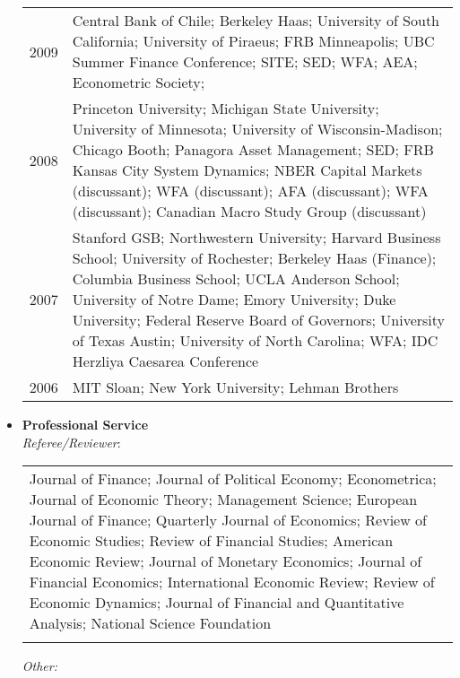 \documentclass[11pt,letterpaper,serif,overlapped]{res}
\begin{document}
\begin{resume}
\begin{itemize}
\begin{longtable}{lp{15cm}}
2009 & Central Bank of Chile; Berkeley Haas; University of South California;   University of Piraeus; FRB Minneapolis;  UBC Summer Finance Conference; SITE;   SED; WFA; AEA; Econometric Society;\\[0.1cm]
2008 & Princeton University; Michigan State University; University of Minnesota;    University of Wisconsin-Madison; Chicago Booth; Panagora Asset Management; SED;   FRB Kansas City System Dynamics; NBER Capital Markets (discussant); WFA (discussant); AFA (discussant); WFA (discussant); Canadian Macro Study Group (discussant)\\[0.1cm]
2007 & Stanford GSB; Northwestern University; Harvard Business School;   University of Rochester; Berkeley Haas (Finance); Columbia Business School;  UCLA Anderson School; University of Notre Dame;    Emory University; Duke University; Federal Reserve Board of Governors;  University of Texas Austin; University of North Carolina;   WFA; IDC Herzliya Caesarea Conference\\[0.1cm]
2006 & MIT Sloan; New York University; Lehman Brothers\\
\end{longtable}
 
\vspace{0.5cm}

\newpage
\item \textbf{Professional Service} \\



\emph{Referee/Reviewer}:\\

 \begin{tabular}{p{16cm}}
Journal of Finance; Journal of Political Economy; Econometrica; Journal of Economic Theory; Management Science; European Journal of Finance; Quarterly Journal of Economics; Review of Economic Studies; Review of Financial Studies; American Economic Review;  Journal of Monetary Economics; Journal of Financial Economics; International Economic Review; Review of Economic Dynamics; Journal of Financial and Quantitative Analysis; National Science Foundation\\\\
 \end{tabular}



\emph{Other:}\\


\end{itemize}
\end{resume}
\end{document}
